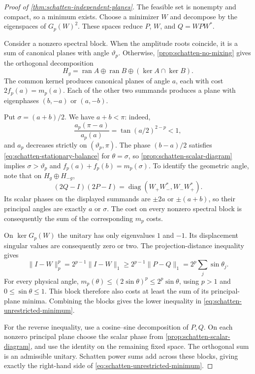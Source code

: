 \begin{proof}[Proof of \cref{thm:schatten-independent-planes}]
The feasible set is nonempty and compact, so a minimum exists. Choose a
minimizer $W$ and decompose by the eigenspaces of $G_p(W)^2$. These
spaces reduce $P$, $W$, and $Q=WPW^*$.

Consider a nonzero spectral block. When the amplitude roots coincide,
it is a sum of canonical planes with angle $\vartheta_p$. Otherwise,
\cref{prop:schatten-no-mixing} gives the orthogonal decomposition
\[
 H_g=\operatorname{ran}A\oplus\operatorname{ran}B
              \oplus(\ker A\cap\ker B).
\]
The common kernel produces canonical planes of angle $a$, each with
cost $2f_p(a)=m_p(a)$. Each of the other two summands produces a plane
with eigenphases $(b,-a)$ or $(a,-b)$.

Put $\sigma=(a+b)/2$. We have $a+b<\pi$: indeed,
\[
 \frac{a_p(\pi-a)}{a_p(a)}
        =\tan(a/2)^{2-p}<1,
\]
and $a_p$ decreases strictly on $(\vartheta_p,\pi)$. The phase
$(b-a)/2$ satisfies \cref{eq:schatten-stationary-balance} for
$\theta=\sigma$, so \cref{prop:schatten-scalar-diagram} implies
$\sigma>\vartheta_p$ and $f_p(a)+f_p(b)=m_p(\sigma)$.
To identify the geometric angle, note that on $H_g\oplus H_{-g}$,
\[
 (2Q-I)(2P-I)=
 \operatorname{diag}(W_+W_-^*,W_-W_+^*).
\]
Its scalar phases on the displayed summands are $\pm2a$ or
$\pm(a+b)$, so their principal angles are exactly $a$ or $\sigma$.
The cost on every nonzero spectral block is consequently the sum of
the corresponding $m_p$ costs.

On $\ker G_p(W)$ the unitary has only eigenvalues $1$ and $-1$.
Its displacement singular values are consequently zero or two. The
projection-distance inequality gives
\[
 \|I-W\|_p^p
   =2^{p-1}\|I-W\|_1
   \geq2^{p-1}\|P-Q\|_1
   =2^p\sum_j\sin\theta_j.
\]
For every physical angle,
$m_p(\theta)\leq(2\sin\theta)^p\leq2^p\sin\theta$, using
$p>1$ and $0\leq\sin\theta\leq1$. This block therefore also costs at
least the sum of its principal-plane minima. Combining the blocks gives
the lower inequality in \cref{eq:schatten-unrestricted-minimum}.

For the reverse inequality, use a cosine--sine decomposition of $P,Q$.
On each nonzero principal plane choose the scalar phase from
\cref{prop:schatten-scalar-diagram}, and use the identity on the remaining
fixed space. The orthogonal sum is an admissible unitary. Schatten
power sums add across these blocks, giving exactly the right-hand side
of \cref{eq:schatten-unrestricted-minimum}.
\end{proof}


